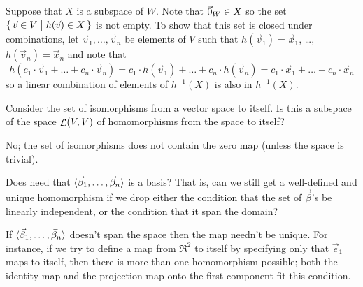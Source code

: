 \begin{exercises}
\begin{answer}
\begin{exparts}
          Suppose that \( X \) is a subspace of \( W \).
          Note that \( \vec{0}_W\in X \) so the set
          \( \mbox{$\{\,\vec{v}\in V \bigm| h(\vec{v})\in X\,\}$} \) is not empty.
          To show that this set is closed under combinations, let
          \( \vec{v}_1,\dots,\vec{v}_n \) be elements of \( V \)
          such that \( h(\vec{v}_1)=\vec{x}_1 \), \ldots,
          \( h(\vec{v}_n)=\vec{x}_n \) and note that 
          \begin{equation*}
            h(c_1\cdot \vec{v}_1+\dots+c_n\cdot \vec{v}_n)
            =c_1\cdot h(\vec{v}_1)+\dots+c_n\cdot h(\vec{v}_n)
            =c_1\cdot \vec{x}_1+\dots+c_n\cdot \vec{x}_n
          \end{equation*}
          so a linear combination of elements of \( h^{-1}(X) \) is also in
          \( h^{-1}(X) \).
      \end{exparts}  
     \end{answer}
  \item 
    Consider the set of isomorphisms from a vector space to itself.
    Is this a subspace of the space \( \mathop{{\cal L}}(V,V) \)
    of homomorphisms from the space to itself?
    \begin{answer}
      No; the set of isomorphisms does not contain the zero map
      (unless the space is trivial).
    \end{answer}
  \item 
   Does  need that
   $\langle\vec{\beta}_1,\ldots,\vec{\beta}_n\rangle$
   is a basis? 
   That is, can we still get a well-defined and unique homomorphism if we
   drop either the condition that the set of $\vec{\beta}$'s 
   be linearly independent, 
   or the condition that it span the domain?
   \begin{answer}
     If $\langle\vec{\beta}_1,\ldots,\vec{\beta}_n\rangle$ doesn't span the space
     then the map needn't be unique.
     For instance, if we try to define a map from $\Re^2$ to itself by 
     specifying only that $\vec{e}_1$ maps to itself, then 
     there is more than
     one homomorphism possible; both the identity map and the projection map 
     onto the first component fit this condition.


\end{answer}
\end{exercises}
